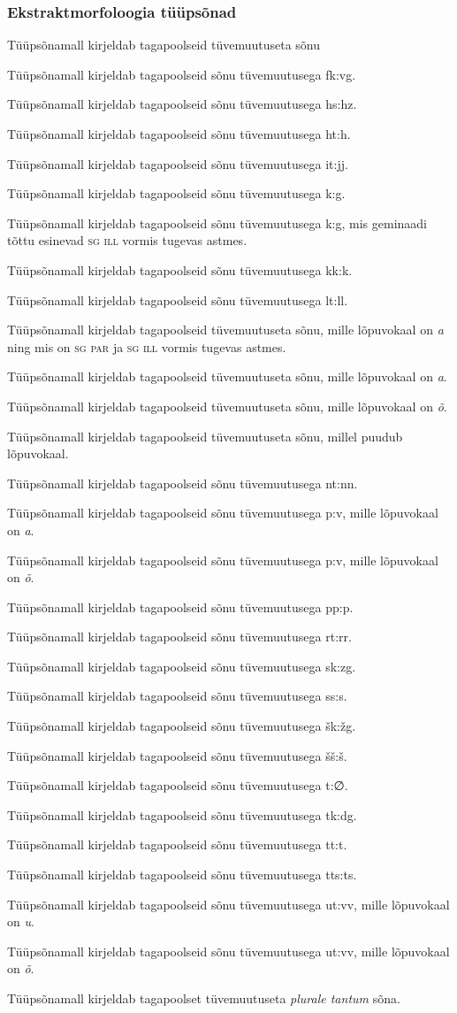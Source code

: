 \documentclass[12pt,a4paper]{article}
\newcommand{\msd}[1]{\textsc{#1}}
\begin{document}
\subsubsection*{Ekstraktmorfoloogia tüüpsõnad}
\vspace{-3.5em}

Tüüpsõna\-mall kirjeldab tagapoolseid tüvemuutuseta sõnu

Tüüpsõna\-mall kirjeldab tagapoolseid sõnu tüvemuutusega fk:vg. 

Tüüpsõna\-mall kirjeldab tagapoolseid sõnu tüvemuutusega hs:hz.

Tüüpsõna\-mall kirjeldab tagapoolseid sõnu tüvemuutusega ht:h.

Tüüpsõna\-mall kirjeldab tagapoolseid sõnu tüvemuutusega it:jj.

Tüüpsõna\-mall kirjeldab tagapoolseid sõnu tüvemuutusega k:g.

Tüüpsõna\-mall kirjeldab tagapoolseid sõnu tüvemuutusega k:g, mis geminaadi tõttu esinevad \msd{sg ill} vormis tugevas astmes.

Tüüpsõna\-mall kirjeldab tagapoolseid sõnu tüvemuutusega kk:k.

Tüüpsõna\-mall kirjeldab tagapoolseid sõnu tüvemuutusega lt:ll.

Tüüpsõna\-mall kirjeldab tagapoolseid tüvemuutuseta sõnu, mille lõpuvokaal on \textit{a} ning mis on \msd{sg par} ja \msd{sg ill} vormis tugevas astmes.

Tüüpsõna\-mall kirjeldab tagapoolseid tüvemuutuseta sõnu, mille lõpuvokaal on \textit{a}.

Tüüpsõna\-mall kirjeldab tagapoolseid tüvemuutuseta sõnu, mille lõpuvokaal on \textit{õ}.

Tüüpsõna\-mall kirjeldab tagapoolseid tüvemuutuseta sõnu, millel puudub lõpuvokaal.

Tüüpsõna\-mall kirjeldab tagapoolseid sõnu tüvemuutusega nt:nn.

Tüüpsõna\-mall kirjeldab tagapoolseid sõnu tüvemuutusega p:v, mille lõpuvokaal on \textit{a}.

Tüüpsõna\-mall kirjeldab tagapoolseid sõnu tüvemuutusega p:v, mille lõpuvokaal on \textit{õ}.

Tüüpsõna\-mall kirjeldab tagapoolseid sõnu tüvemuutusega pp:p.

Tüüpsõna\-mall kirjeldab tagapoolseid sõnu tüvemuutusega rt:rr.

Tüüpsõna\-mall kirjeldab tagapoolseid sõnu tüvemuutusega sk:zg.

Tüüpsõna\-mall kirjeldab tagapoolseid sõnu tüvemuutusega ss:s.

Tüüpsõna\-mall kirjeldab tagapoolseid sõnu tüvemuutusega šk:žg.

Tüüpsõna\-mall kirjeldab tagapoolseid sõnu tüvemuutusega šš:š.

Tüüpsõna\-mall kirjeldab tagapoolseid sõnu tüvemuutusega t:∅.

Tüüpsõna\-mall kirjeldab tagapoolseid sõnu tüvemuutusega tk:dg.

Tüüpsõna\-mall kirjeldab tagapoolseid sõnu tüvemuutusega tt:t.

Tüüpsõna\-mall kirjeldab tagapoolseid sõnu tüvemuutusega tts:ts.

Tüüpsõna\-mall kirjeldab tagapoolseid sõnu tüvemuutusega ut:vv, mille lõpuvokaal on \textit{u}.

Tüüpsõna\-mall kirjeldab tagapoolseid sõnu tüvemuutusega ut:vv, mille lõpuvokaal on \textit{õ}.

Tüüpsõna\-mall kirjeldab tagapoolset tüvemuutuseta \textit{plurale tantum} sõna.
\end{document}
